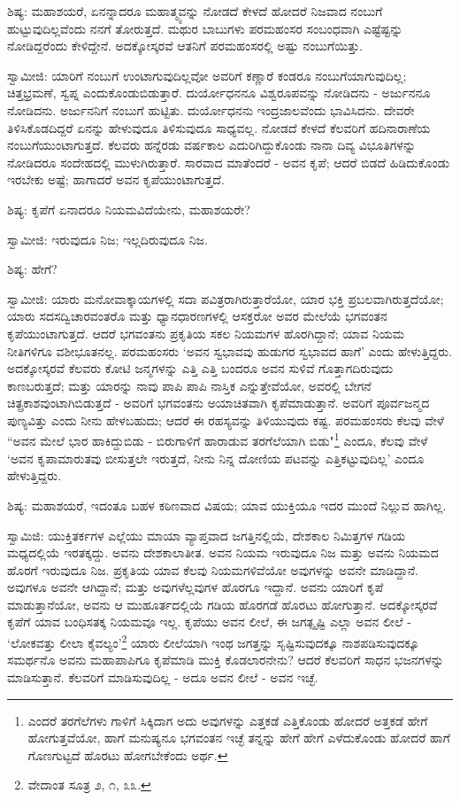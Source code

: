 ಶಿಷ್ಯ: ಮಹಾಶಯರೆ, ಏನನ್ನಾದರೂ ಮಹಾತ್ಮ್ಯವನ್ನು ನೋಡದೆ ಕೇಳದೆ ಹೋದರೆ ನಿಜವಾದ ನಂಬುಗೆ ಹುಟ್ಟುವುದಿಲ್ಲವೆಂದು ನನಗೆ ತೋರುತ್ತದೆ. ಮಥುರ ಬಾಬುಗಳು ಪರಮಹಂಸರ ಸಂಬಂಧವಾಗಿ ಎಷ್ಟೆಷ್ಟನ್ನು ನೋಡಿದ್ದರೆಂದು ಕೇಳಿದ್ದೇನೆ. ಅದಕ್ಕೋಸ್ಕರವೆ ಆತನಿಗೆ ಪರಮಹಂಸರಲ್ಲಿ ಅಷ್ಟು ನಂಬುಗೆಯಿತ್ತು.

ಸ್ವಾಮೀಜಿ: ಯಾರಿಗೆ ನಂಬುಗೆ ಉಂಟಾಗುವುದಿಲ್ಲವೋ ಅವರಿಗೆ ಕಣ್ಣಾರೆ ಕಂಡರೂ ನಂಬುಗೆಯಾಗುವುದಿಲ್ಲ; ಚಿತ್ತಭ್ರಮಣೆ, ಸ್ವಪ್ನ ಎಂದುಕೊಂಡುಬಿಡುತ್ತಾರೆ. ದುರ್ಯೋಧನನೂ ವಿಶ್ವರೂಪವನ್ನು ನೋಡಿದನು - ಅರ್ಜುನನೂ ನೋಡಿದನು. ಅರ್ಜುನನಿಗೆ ನಂಬುಗೆ ಹುಟ್ಟಿತು. ದುರ್ಯೋಧನನು ಇಂದ್ರಜಾಲವೆಂದು ಭಾವಿಸಿದನು. ದೇವರೇ ತಿಳಿಸಿಕೊಡದಿದ್ದರೆ ಏನನ್ನು ಹೇಳುವುದೂ ತಿಳಿಸುವುದೂ ಸಾಧ್ಯವಲ್ಲ. ನೋಡದೆ ಕೇಳದೆ ಕೆಲವರಿಗೆ ಹದಿನಾರಾಣೆಯ ನಂಬುಗೆಯುಂಟಾಗುತ್ತದೆ. ಕೆಲವರು ಹನ್ನೆರಡು ವರ್ಷಕಾಲ ಎದುರಿಗಿದ್ದುಕೊಂಡು ನಾನಾ ದಿವ್ಯ ವಿಭೂತಿಗಳನ್ನು ನೋಡಿದರೂ ಸಂದೇಹದಲ್ಲಿ ಮುಳುಗಿರುತ್ತಾರೆ. ಸಾರವಾದ ಮಾತೆಂದರೆ - ಅವನ ಕೃಪೆ; ಆದರೆ ಬಿಡದೆ ಹಿಡಿದುಕೊಂಡು ಇರಬೇಕು ಅಷ್ಟೆ; ಹಾಗಾದರೆ ಅವನ ಕೃಪೆಯುಂಟಾಗುತ್ತದೆ.

ಶಿಷ್ಯ: ಕೃಪೆಗೆ ಏನಾದರೂ ನಿಯಮವಿದೆಯೇನು, ಮಹಾಶಯರೇ?

ಸ್ವಾಮೀಜಿ: ಇರುವುದೂ ನಿಜ; ಇಲ್ಲದಿರುವುದೂ ನಿಜ.

ಶಿಷ್ಯ: ಹೇಗೆ?

ಸ್ವಾಮೀಜಿ: ಯಾರು ಮನೋವಾಕ್ಕಾಯಗಳಲ್ಲಿ ಸದಾ ಪವಿತ್ರರಾಗಿರುತ್ತಾರೆಯೋ, ಯಾರ ಭಕ್ತಿ ಪ್ರಬಲವಾಗಿರುತ್ತದೆಯೋ; ಯಾರು ಸದಸದ್ವಿಚಾರವಂತರೊ ಮತ್ತು ಧ್ಯಾನಧಾರಣಗಳಲ್ಲಿ ಆಸಕ್ತರೋ ಅವರ ಮೇಲೆಯೆ ಭಗವಂತನ ಕೃಪೆಯುಂಟಾಗುತ್ತದೆ. ಆದರೆ ಭಗವಂತನು ಪ್ರಕೃತಿಯ ಸಕಲ ನಿಯಮಗಳ ಹೊರಗಿದ್ದಾನೆ; ಯಾವ ನಿಯಮ ನೀತಿಗಳಿಗೂ ವಶೀಭೂತನಲ್ಲ. ಪರಮಹಂಸರು ‘ಅವನ ಸ್ವಭಾವವು ಹುಡುಗರ ಸ್ವಭಾವದ ಹಾಗೆ’ ಎಂದು ಹೇಳುತ್ತಿದ್ದರು. ಅದಕ್ಕೋಸ್ಕರವೆ ಕೆಲವರು ಕೋಟಿ ಜನ್ಮಗಳನ್ನು ಎತ್ತಿ ಎತ್ತಿ ಬಂದರೂ ಅವನ ಸುಳಿವೆ ಗೊತ್ತಾಗದಿರುವುದು ಕಾಣಬರುತ್ತದೆ; ಮತ್ತು ಯಾರನ್ನು ನಾವು ಪಾಪಿ ಪಾಪಿ ನಾಸ್ತಿಕ ಎನ್ನುತ್ತೇವೆಯೋ, ಅವರಲ್ಲಿ ಬೇಗನೆ ಚಿತ್ಪ್ರಕಾಶವುಂಟಾಗಿಬಿಡುತ್ತದೆ - ಅವರಿಗೆ ಭಗವಂತನು ಅಯಾಚಿತವಾಗಿ ಕೃಪೆಮಾಡುತ್ತಾನೆ. ಅವರಿಗೆ ಪೂರ್ವಜನ್ಮದ ಪುಣ್ಯವಿತ್ತು ಎಂದು ನೀನು ಹೇಳಬಹುದು; ಆದರೆ ಈ ರಹಸ್ಯವನ್ನು ತಿಳಿಯುವುದು ಕಷ್ಟ. ಪರಮಹಂಸರು ಕೆಲವು ವೇಳೆ “ಅವನ ಮೇಲೆ ಭಾರ ಹಾಕಿದ್ದುಬಿಡು - ಬಿರುಗಾಳಿಗೆ ಹಾರಾಡುವ ತರಗೆಲೆಯಾಗಿ ಬಿಡು"\footnote{ಎಂದರೆ ತರಗೆಲೆಗಳು ಗಾಳಿಗೆ ಸಿಕ್ಕಿದಾಗ ಅದು ಅವುಗಳನ್ನು ಎತ್ತಕಡೆ ಎತ್ತಿಕೊಂಡು ಹೋದರೆ ಅತ್ತಕಡೆ ಹೇಗೆ ಹೋಗುತ್ತವೆಯೋ, ಹಾಗೆ ಮನುಷ್ಯನೂ ಭಗವಂತನ ಇಚ್ಛೆ ತನ್ನನ್ನು ಹೇಗೆ ಹೇಗೆ ಎಳೆದುಕೊಂಡು ಹೋದರೆ ಹಾಗೆ ಗೊಣಗುಟ್ಟದೆ ಹೊರಟು ಹೋಗಬೇಕೆಂದು ಅರ್ಥ.} ಎಂದೂ, ಕೆಲವು ವೇಳೆ ‘ಅವನ ಕೃಪಾಮಾರುತವು ಬೀಸುತ್ತಲೇ ಇರುತ್ತದೆ, ನೀನು ನಿನ್ನ ದೋಣಿಯ ಪಟವನ್ನು ಎತ್ತಿಕಟ್ಟುವುದಿಲ್ಲ’ ಎಂದೂ ಹೇಳುತ್ತಿದ್ದರು.

ಶಿಷ್ಯ: ಮಹಾಶಯರೆ, ಇದಂತೂ ಬಹಳ ಕಠಿಣವಾದ ವಿಷಯ; ಯಾವ ಯುಕ್ತಿಯೂ ಇದರ ಮುಂದೆ ನಿಲ್ಲುವ ಹಾಗಿಲ್ಲ.

ಸ್ವಾಮಿಜಿ: ಯುಕ್ತಿತರ್ಕಗಳ ಎಲ್ಲೆಯು ಮಾಯಾ ವ್ಯಾಪ್ತವಾದ ಜಗತ್ತಿನಲ್ಲಿಯೆ, ದೇಶಕಾಲ ನಿಮಿತ್ತಗಳ ಗಡಿಯ ಮಧ್ಯದಲ್ಲಿಯೆ ಇರತಕ್ಕದ್ದು. ಅವನು ದೇಶಕಾಲಾತೀತ. ಅವನ ನಿಯಮ ಇರುವುದೂ ನಿಜ ಮತ್ತು ಅವನು ನಿಯಮದ ಹೊರಗೆ ಇರುವುದೂ ನಿಜ. ಪ್ರಕೃತಿಯ ಯಾವ ಕೆಲವು ನಿಯಮಗಳಿವೆಯೋ ಅವುಗಳನ್ನು ಅವನೇ ಮಾಡಿದ್ದಾನೆ. ಅವುಗಳೂ ಅವನೇ ಆಗಿದ್ದಾನೆ; ಮತ್ತು ಅವುಗಳೆಲ್ಲವುಗಳ ಹೊರಗೂ ಇದ್ದಾನೆ. ಅವನು ಯಾರಿಗೆ ಕೃಪೆ ಮಾಡುತ್ತಾನೆಯೋ, ಅವನು ಆ ಮುಹೂರ್ತದಲ್ಲಿಯೆ ಗಡಿಯ ಹೊರಗಡೆ ಹೊರಟು ಹೋಗುತ್ತಾನೆ. ಅದಕ್ಕೋಸ್ಕರವೆ ಕೃಪೆಗೆ ಯಾವ ಬಂಧಿಸತಕ್ಕ ನಿಯಮವೂ ಇಲ್ಲ. ಕೃಪೆಯು ಅವನ ಲೀಲೆ, ಈ ಜಗತ್ಸೃಷ್ಟಿ ಎಲ್ಲಾ ಅವನ ಲೀಲೆ - ‘ಲೋಕವತ್ತು ಲೀಲಾ ಕೈವಲ್ಯಂ’\footnote{ವೇದಾಂತ ಸೂತ್ರ ೨, ೧, ೩೩.} ಯಾರು ಲೀಲೆಯಾಗಿ ಇಂಥ ಜಗತ್ತನ್ನು ಸೃಷ್ಟಿಸುವುದಕ್ಕೂ ನಾಶಪಡಿಸುವುದಕ್ಕೂ ಸಮರ್ಥನೊ ಅವನು ಮಹಾಪಾಪಿಗೂ ಕೃಪೆಮಾಡಿ ಮುಕ್ತಿ ಕೊಡಲಾರನೇನು? ಆದರೆ ಕೆಲವರಿಗೆ ಸಾಧನ ಭಜನಗಳನ್ನು ಮಾಡಿಸುತ್ತಾನೆ. ಕೆಲವರಿಗೆ ಮಾಡಿಸುವುದಿಲ್ಲ - ಅದೂ ಅವನ ಲೀಲೆ - ಅವನ ಇಚ್ಛೆ.

